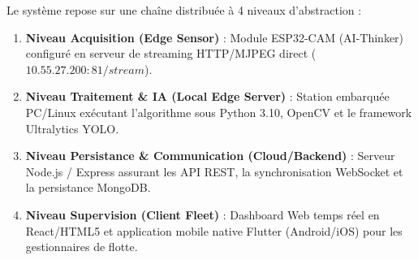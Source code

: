 \documentclass[11pt,a4paper]{article}
\begin{document}
Le système repose sur une chaîne distribuée à 4 niveaux d'abstraction :
\begin{enumerate}
    \item \textbf{Niveau Acquisition (Edge Sensor)} : Module ESP32-CAM (AI-Thinker) configuré en serveur de streaming HTTP/MJPEG direct ($10.55.27.200:81/stream$).
    \item \textbf{Niveau Traitement \& IA (Local Edge Server)} : Station embarquée PC/Linux exécutant l'algorithme sous Python 3.10, OpenCV et le framework Ultralytics YOLO.
    \item \textbf{Niveau Persistance \& Communication (Cloud/Backend)} : Serveur Node.js / Express assurant les API REST, la synchronisation WebSocket et la persistance MongoDB.
    \item \textbf{Niveau Supervision (Client Fleet)} : Dashboard Web temps réel en React/HTML5 et application mobile native Flutter (Android/iOS) pour les gestionnaires de flotte.
\end{enumerate}
\end{document}
